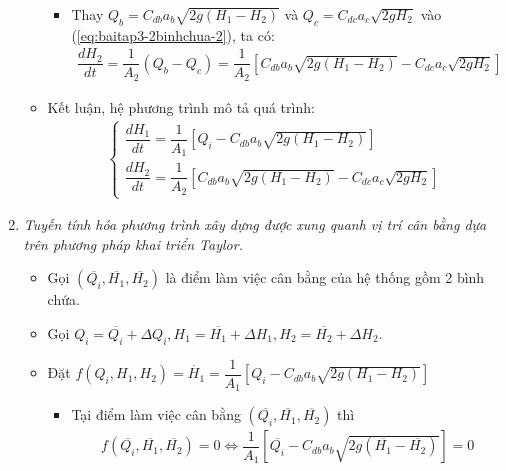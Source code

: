 \begin{enumerate}[\it a.]
\begin{itemize}
\begin{itemize}
                        \item Thay $Q_b = C_{db}a_b\sqrt{2g(H_1 - H_2)}$ và $Q_c = C_{dc}a_c\sqrt{2gH_2}$ vào (\ref{eq:baitap3-2binhchua-2}), ta có:
                            \begin{align}
                                \dfrac{dH_2}{dt} = \dfrac{1}{A_2} \left({Q_b - Q_c}\right) = \dfrac{1}{A_2} \left[{C_{db}a_b\sqrt{2g(H_1 - H_2)} - C_{dc}a_c\sqrt{2gH_2}}\right]
                            \end{align}
                    \end{itemize}

                \item Kết luận, hệ phương trình mô tả quá trình:
                    \begin{align}
                        \left\{
                        \begin{array}{l}
                            \dfrac{dH_1}{dt} = \dfrac{1}{A_1} \left[{Q_i - C_{db}a_b\sqrt{2g(H_1 - H_2)}}\right]\\ [.5cm]
                            \dfrac{dH_2}{dt} = \dfrac{1}{A_2} \left[{C_{db}a_b\sqrt{2g(H_1 - H_2)} - C_{dc}a_c\sqrt{2gH_2}}\right]
                        \end{array}
                        \right.
                    \end{align}
            \end{itemize}

        \item \textit{Tuyến tính hóa phương trình xây dựng được xung quanh vị trí cân bằng dựa trên phương pháp khai triển Taylor.}
            \begin{itemize}
                \item Gọi $\left({\overline{Q_i}, \overline{H_1}, \overline{H_2}}\right)$ là điểm làm việc cân bằng của hệ thống gồm 2 bình chứa.

                \item Gọi $Q_i = \overline{Q_i} + \Delta Q_i, H_1 = \overline{H_1} + \Delta H_1, H_2 = \overline{H_2} + \Delta H_2$.

                \item Đặt $f\left({Q_i, H_1, H_2}\right) = \dot{H_1} = \dfrac{1}{A_1} \left[{Q_i - C_{db}a_b\sqrt{2g(H_1 - H_2)}}\right]$
                    \begin{itemize}
                        \item Tại điểm làm việc cân bằng $\left({\overline{Q_i}, \overline{H_1}, \overline{H_2}}\right)$ thì
                            \begin{align}
                                f\left({\overline{Q_i}, \overline{H_1}, \overline{H_2}}\right) = 0 \Longleftrightarrow \dfrac{1}{A_1} \left[{\overline{Q_i} - C_{db}a_b\sqrt{2g(\overline{H_1} - \overline{H_2})}}\right] = 0
                            \end{align}


\end{itemize}
\end{itemize}
\end{enumerate}
